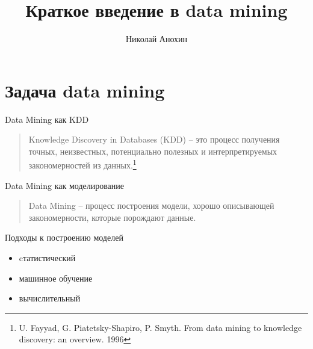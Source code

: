 \documentclass[aspectratio=169]{beamer}
\author{Николай Анохин}
\title{Краткое введение в data mining}
\date{}
\begin{document}
\begin{frame}
\titlepage
\end{frame}

\section{Задача data mining}

\begin{frame}{Data Mining как KDD}

\begin{quote}{Knowledge Discovery in Databases (KDD)}
-- это процесс получения точных, неизвестных, потенциально полезных и интерпретируемых закономерностей из данных.\footnote{U. Fayyad, G. Piatetsky-Shapiro, P. Smyth. From data mining to knowledge discovery: an overview. 1996\vspace{1.5em}}
\end{quote}

\end{frame}

\begin{frame}{Data Mining как моделирование}

\begin{quote}{Data Mining}
-- процесс построения модели, хорошо описывающей закономерности, которые порождают данные.
\end{quote}

Подходы к построению моделей
\begin{itemize}
\item cтатистический
\item машинное обучение
\item вычислительный
\end{itemize}

\end{frame}
\end{document}
